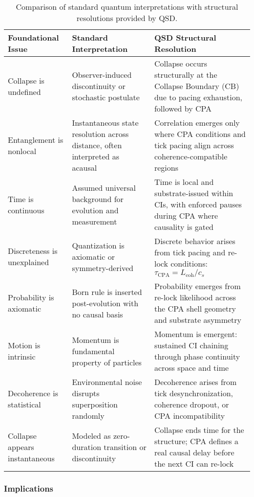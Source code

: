 \documentclass[preprints,article,submit,pdftex,moreauthors]{Definitions/mdpi}
\begin{document}
\begin{table}[h!]
\centering
\renewcommand{\arraystretch}{1.4}
\begin{tabular}{|p{3.8cm}|p{5.3cm}|p{5.8cm}|}
\hline
\textbf{Foundational Issue} & \textbf{Standard Interpretation} & \textbf{QSD Structural Resolution} \\
\hline
Collapse is undefined & Observer-induced discontinuity or stochastic postulate & Collapse occurs structurally at the Collapse Boundary (CB) due to pacing exhaustion, followed by CPA \\
\hline
Entanglement is nonlocal & Instantaneous state resolution across distance, often interpreted as acausal & Correlation emerges only where CPA conditions and tick pacing align across coherence-compatible regions \\
\hline
Time is continuous & Assumed universal background for evolution and measurement & Time is local and substrate-issued within CIs, with enforced pauses during CPA where causality is gated \\
\hline
Discreteness is unexplained & Quantization is axiomatic or symmetry-derived & Discrete behavior arises from tick pacing and re-lock conditions: $\tau_{\text{CPA}} = L_{\text{coh}} / c_s$ \\
\hline
Probability is axiomatic & Born rule is inserted post-evolution with no causal basis & Probability emerges from re-lock likelihood across the CPA shell geometry and substrate asymmetry \\
\hline
Motion is intrinsic & Momentum is fundamental property of particles & Momentum is emergent: sustained CI chaining through phase continuity across space and time \\
\hline
Decoherence is statistical & Environmental noise disrupts superposition randomly & Decoherence arises from tick desynchronization, coherence dropout, or CPA incompatibility \\
\hline
Collapse appears instantaneous & Modeled as zero-duration transition or discontinuity & Collapse ends time for the structure; CPA defines a real causal delay before the next CI can re-lock \\
\hline
\end{tabular}
\caption{Comparison of standard quantum interpretations with structural resolutions provided by QSD.}
\end{table}

\subsubsection{Implications}
\end{document}
